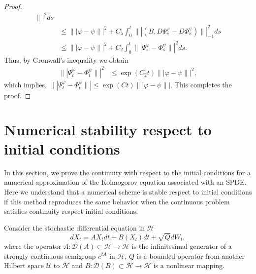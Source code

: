 \documentclass[review,onefignum,onetabnum]{siamart190516}
\begin{document}
\begin{proof}
\begin{align*}
            \| |^2ds
            \\
            &\le  
            \||
                \varphi - \psi
            \||^2
            + C_\lambda
            \int_0^t  
            \||
                (B,D\Psi_s^\varphi-D\Phi_s^\psi) 
            \||_{-1}^2 ds
        \\
            &\le  
            \||\varphi - \psi\||^2
            + C_2
            \int_0^t  
                \||
                    \Psi_s^\varphi-\Phi_s^\psi
                \||^2 ds.
        \end{align*}
        Thus, by Gronwall's inequality we obtain
        \begin{align}\label{s2.23}
            \||
                \Psi_t^\varphi-\Phi_t^\psi
            \||^2
            &\le 
            \exp(C_2t)  
            \|| \varphi - \psi \||^2, 
        \end{align}
        which implies,
        $
            \|| \Psi_t^\varphi-\Phi_t^\psi \||
            \le \exp(Ct)  \|| \varphi - \psi\||.
        $
        This completes the proof.
    \end{proof}

\section{Numerical stability respect to  initial conditions}
\label{sec:ContinuityRespectToInitialConditions}

        In this section, we prove the continuity with respect to the initial
    conditions for a numerical approximation of the Kolmogorov equation 
    associated with an SPDE. Here we understand that a  numerical scheme is 
    stable respect to initial conditions if this method reproduces the same 
    behavior when the continuous problem satisfies continuity respect initial 
    conditions.

    Consider the stochastic differential equation in $\mathcal{H}$
    \begin{equation}
        \label{P1s2.1}
         dX_t = AX_t dt + B(X_t) dt + \sqrt{Q}dW_t,
    \end{equation}
    where the operator 
    $
        A:\mathcal{D}(A)\subset \mathcal{H}\rightarrow
        \mathcal{H}
    $ is the infinitesimal generator of a strongly
    continuous semigroup $e^{tA}$ in $\mathcal{H}$, $Q$ is a bounded operator 
    from another Hilbert space $\mathcal{U}$ to $\mathcal{H}$
    and $B:\mathcal{D}(B)\subset \mathcal{H}\rightarrow \mathcal{H}$ is a
    nonlinear mapping.
\end{document}

